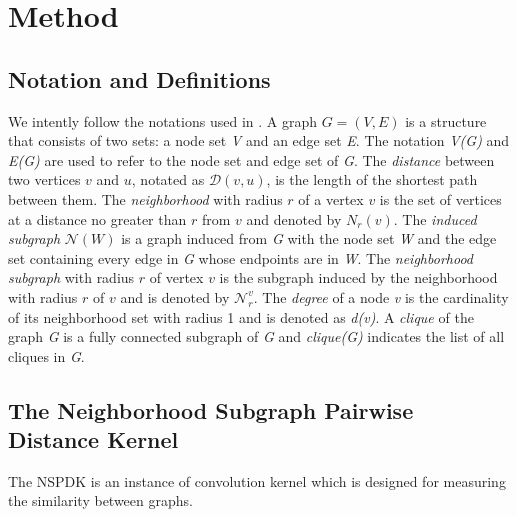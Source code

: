 \documentclass{esannV2}
\begin{document}
\section{Method}\label{method}
\subsection{Notation and Definitions}
We intently follow the notations used in \cite{nspdk}. A graph $G = (V,E)$ is a structure that consists of two sets: a node set \textit{V} and an edge set \textit{E}. The notation \textit{V(G)} and \textit{E(G)} are used to refer to the node set and edge set of \textit{G}. The \textit{distance} between two vertices $v$ and $u$, notated as $\mathcal{D}(v,u)$, is the length of the shortest path between them. The \textit{neighborhood} with radius $r$ of a vertex $v$ is the set of vertices at a distance no greater than $r$ from $v$ and denoted by $N_r(v)$. The \textit{induced subgraph} $\mathcal{N}(W)$ is a graph induced from \textit{G} with the node set \textit{W} and the edge set containing every edge in \textit{G} whose endpoints  are in \textit{W}. The \textit{neighborhood subgraph} with radius $r$ of vertex $v$ is the subgraph induced by the neighborhood with radius $r$ of $v$ and is denoted by $\mathcal{N}_{r}^{v}$. The \textit{degree} of a node \textit{v} is the cardinality of its neighborhood set with radius 1 and is denoted as \textit{d(v)}. A \textit{clique} of the graph \textit{G} is a fully connected subgraph of \textit{G} and \textit{clique(G)} indicates the list of all cliques in \textit{G}.
\subsection{The Neighborhood Subgraph Pairwise Distance Kernel}
The NSPDK is an instance of convolution kernel which is designed for measuring the similarity between graphs.
\end{document}
